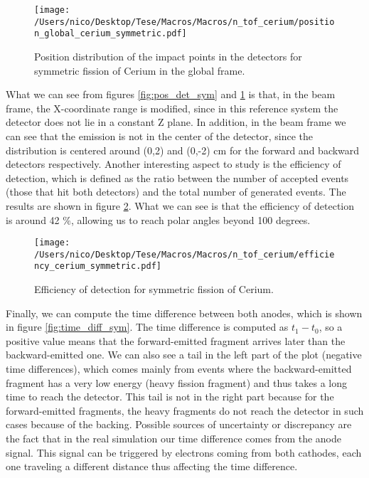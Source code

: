 \documentclass{article}
\begin{document}
\begin{figure}[H] 
    \centering
    \texttt{[image: /Users/nico/Desktop/Tese/Macros/Macros/n\_tof\_cerium/position\_global\_cerium\_symmetric.pdf]}
    \caption{Position distribution of the impact points in the detectors for symmetric fission of Cerium in the global frame.}
    \label{fig:pos_glob_sym}
\end{figure}

What we can see from figures \ref{fig:pos_det_sym} and \ref{fig:pos_glob_sym} is that, in the beam frame, the X-coordinate range is modified, since in this reference system the detector does not lie in a constant Z plane. 
In addition, in the beam frame we can see that the emission is not in the center of the detector, since the distribution is centered around (0,2) and (0,-2) cm for the forward and backward detectors respectively. 
Another interesting aspect to study is the efficiency of detection, which is defined as the ratio between the number of accepted events (those that hit both detectors) and the total number of generated events. The results are shown in figure \ref{fig:eff_sym}. What we can see is that the efficiency of detection is around 42 $\%$, allowing us to reach polar angles beyond 100 degrees.
\begin{figure}[H]
    \centering
    \texttt{[image: /Users/nico/Desktop/Tese/Macros/Macros/n\_tof\_cerium/efficiency\_cerium\_symmetric.pdf]}
    \caption{Efficiency of detection for symmetric fission of Cerium.}
    \label{fig:eff_sym}
\end{figure}

Finally, we can compute the time difference between both anodes, which is shown in figure \ref{fig:time_diff_sym}. The time difference is computed as $t_{1}-t_{0}$, so a positive value means that the forward-emitted fragment arrives later than the backward-emitted one.
We can also see a tail in the left part of the plot (negative time differences), which comes mainly from events where the backward-emitted fragment has a very low energy (heavy fission fragment) and thus takes a long time to reach the detector. 
This tail is not in the right part because for the forward-emitted fragments, the heavy fragments do not reach the detector in such cases because of the backing. 
Possible sources of uncertainty or discrepancy are the fact that in the real simulation our time difference comes from the anode signal. This signal can be triggered by electrons coming from both cathodes, each one traveling a different distance thus affecting the time difference.
\end{document}
